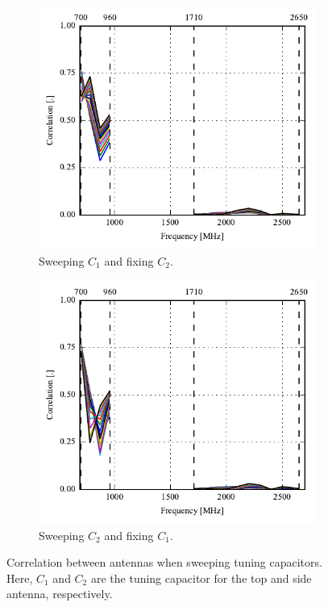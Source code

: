 \begin{figure}[htbp]
    \centering
    \begin{subfigure}{0.49\linewidth}
        \includegraphics{img/tech_sol/monopole/free_space/s11_corr}
        \caption{Sweeping $C_1$ and fixing $C_2$.}
    \end{subfigure}
    \hfill
    \begin{subfigure}{0.49\linewidth}
        \includegraphics{img/tech_sol/monopole/free_space/s22_corr}
        \caption{Sweeping $C_2$ and fixing $C_1$.}
    \end{subfigure}
    \caption{Correlation between antennas when sweeping tuning capacitors. Here, $C_1$ and $C_2$ are the tuning capacitor for the top and side antenna, respectively.}
    \label{fig:corr_sol1}
\end{figure}

